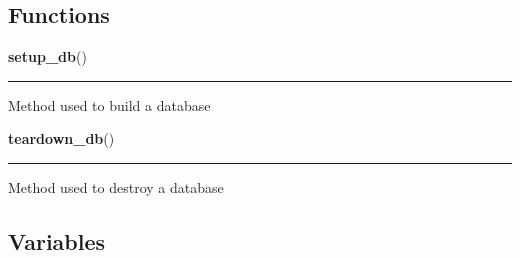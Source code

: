 
  \subsection{Functions}

    \label{saip:tests:setup_db}

    \vspace{0.5ex}

\hspace{.8\funcindent}\begin{boxedminipage}{\funcwidth}

    \raggedright \textbf{setup\_db}()

    \vspace{-1.5ex}

    \rule{\textwidth}{0.5\fboxrule}
\setlength{\parskip}{2ex}
    Method used to build a database

\setlength{\parskip}{1ex}
    \end{boxedminipage}

    \label{saip:tests:teardown_db}

    \vspace{0.5ex}

\hspace{.8\funcindent}\begin{boxedminipage}{\funcwidth}

    \raggedright \textbf{teardown\_db}()

    \vspace{-1.5ex}

    \rule{\textwidth}{0.5\fboxrule}
\setlength{\parskip}{2ex}
    Method used to destroy a database

\setlength{\parskip}{1ex}
    \end{boxedminipage}



  \subsection{Variables}

